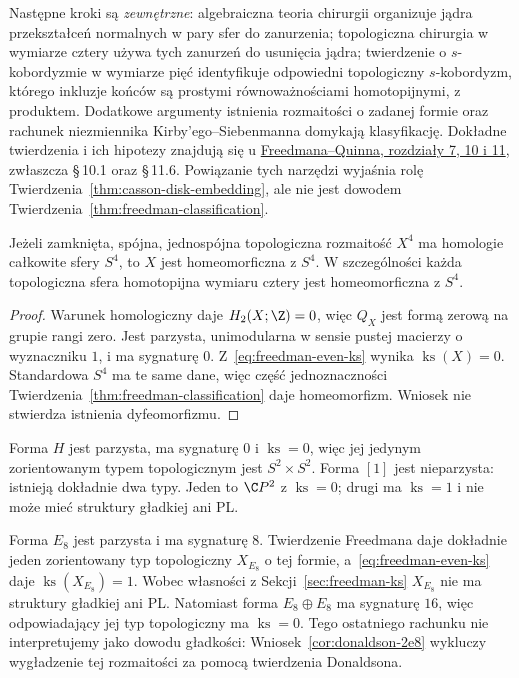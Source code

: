 Następne kroki są \emph{zewnętrzne}: algebraiczna
teoria chirurgii organizuje jądra przekształceń
normalnych w pary sfer do zanurzenia; topologiczna
chirurgia w wymiarze cztery używa tych zanurzeń
do usunięcia jądra; twierdzenie o $s$-kobordyzmie
w wymiarze pięć identyfikuje odpowiedni topologiczny
$s$-kobordyzm, którego inkluzje końców są prostymi
równoważnościami homotopijnymi, z produktem.
Dodatkowe argumenty istnienia rozmaitości
o zadanej formie oraz rachunek niezmiennika
Kirby'ego--Siebenmanna domykają klasyfikację.
Dokładne twierdzenia i ich hipotezy znajdują się
u \href{https://archive.mpim-bonn.mpg.de/4789/2/FreedmanQuinn-TopologyOf4Manifolds-Reformatted2013.pdf}
{Freedmana--Quinna, rozdziały 7, 10 i 11},
zwłaszcza \S\,10.1 oraz \S\,11.6.
Powiązanie tych narzędzi wyjaśnia rolę
Twierdzenia~\ref{thm:casson-disk-embedding},
ale nie jest dowodem
Twierdzenia~\ref{thm:freedman-classification}.

\begin{wniosek}
\label{cor:freedman-poincare-4}
Jeżeli zamknięta, spójna, jednospójna topologiczna
rozmaitość $X^4$ ma homologie całkowite sfery $S^4$,
to $X$ jest homeomorficzna z $S^4$.
W szczególności każda topologiczna sfera homotopijna
wymiaru cztery jest homeomorficzna z $S^4$.
\end{wniosek}
\begin{proof}
Warunek homologiczny daje $H_2(X;\Z)=0$, więc
$Q_X$ jest formą zerową na grupie rangi zero.
Jest parzysta, unimodularna w sensie pustej macierzy
o wyznaczniku $1$, i ma sygnaturę $0$.
Z~\eqref{eq:freedman-even-ks} wynika
$\operatorname{ks}(X)=0$. Standardowa $S^4$
ma te same dane, więc część jednoznaczności
Twierdzenia~\ref{thm:freedman-classification}
daje homeomorfizm. Wniosek nie stwierdza
istnienia dyfeomorfizmu.
\end{proof}

\begin{przyklad}
\label{prz:freedman-examples}
Forma $H$ jest parzysta, ma sygnaturę $0$ i
$\operatorname{ks}=0$, więc jej jedynym zorientowanym
typem topologicznym jest $S^2\times S^2$.
Forma $[1]$ jest nieparzysta: istnieją dokładnie
dwa typy. Jeden to $\C P^2$ z
$\operatorname{ks}=0$; drugi ma $\operatorname{ks}=1$
i nie może mieć struktury gładkiej ani PL.

Forma $E_8$ jest parzysta i ma sygnaturę $8$.
Twierdzenie Freedmana daje dokładnie jeden
zorientowany typ topologiczny $X_{E_8}$ o tej formie,
a~\eqref{eq:freedman-even-ks} daje
$\operatorname{ks}(X_{E_8})=1$.
Wobec własności z Sekcji~\ref{sec:freedman-ks}
$X_{E_8}$ nie ma struktury gładkiej ani PL.
Natomiast forma $E_8\oplus E_8$ ma sygnaturę $16$,
więc odpowiadający jej typ topologiczny ma
$\operatorname{ks}=0$. Tego ostatniego rachunku
nie interpretujemy jako dowodu gładkości:
Wniosek~\ref{cor:donaldson-2e8} wykluczy
wygładzenie tej rozmaitości za pomocą
twierdzenia Donaldsona.
\end{przyklad}

